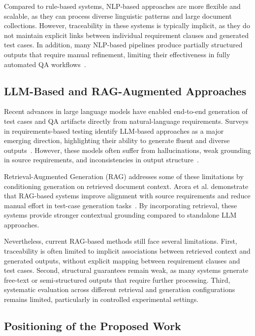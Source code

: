 \documentclass[conference]{IEEEtran}
\begin{document}
Compared to rule-based systems, NLP-based approaches are more flexible and scalable, as they can process diverse linguistic patterns and large document collections. However, traceability in these systems is typically implicit, as they do not maintain explicit links between individual requirement clauses and generated test cases. In addition, many NLP-based pipelines produce partially structured outputs that require manual refinement, limiting their effectiveness in fully automated QA workflows~\cite{Kumar2025NLRequirements}.

\subsection{LLM-Based and RAG-Augmented Approaches}

Recent advances in large language models have enabled end-to-end generation of test cases and QA artifacts directly from natural-language requirements. Surveys in requirements-based testing identify LLM-based approaches as a major emerging direction, highlighting their ability to generate fluent and diverse outputs~\cite{RE2025SurveyRBTG,RE2025RAGinSE}. However, these models often suffer from hallucinations, weak grounding in source requirements, and inconsistencies in output structure~\cite{ji2023,RE2025SurveyRBTG}.

Retrieval-Augmented Generation (RAG) addresses some of these limitations by conditioning generation on retrieved document context. Arora et al. demonstrate that RAG-based systems improve alignment with source requirements and reduce manual effort in test-case generation tasks~\cite{Arora2024RAGTAG}. By incorporating retrieval, these systems provide stronger contextual grounding compared to standalone LLM approaches.

Nevertheless, current RAG-based methods still face several limitations. First, traceability is often limited to implicit associations between retrieved context and generated outputs, without explicit mapping between requirement clauses and test cases. Second, structural guarantees remain weak, as many systems generate free-text or semi-structured outputs that require further processing. Third, systematic evaluation across different retrieval and generation configurations remains limited, particularly in controlled experimental settings.

\subsection{Positioning of the Proposed Work}
\end{document}
